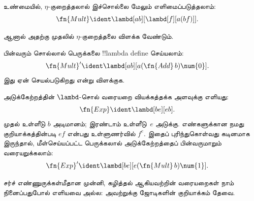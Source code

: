 \documentclass[../../../include/open-logic-section]{subfiles}
\begin{document}
\begin{editorial}
உண்மையில், $\eta$-குறைத்தலால் இச்சொல்லை மேலும் எளிமைப்படுத்தலாம்:
\[
  \fn{Mult} \ident \lambd[ab][\lambd[f][a (b f)]].
\]

ஆனால் அதற்கு முதலில் $\eta$-குறைத்தலை விளக்க வேண்டும்.
\end{editorial}

\begin{prob}
பின்வரும் சொல்லால் பெருக்கலை !!{lambda define} செய்யலாம்:
\[
  \fn{Mult}' \ident \lambd[ab][a (\fn{Add}\, b) \num{0}].
\]
இது ஏன் செயல்படுகிறது என்று விளக்குக.
\end{prob}

அடுக்கேற்றத்தின் $\lambd$-சொல் வரையறை வியக்கத்தக்க அளவுக்கு எளியது:
\[
  \fn{Exp} \ident \lambd[be][e b].
\]
முதல் உள்ளீடு $b$ அடிமானம்; இரண்டாம் உள்ளீடு~$e$ அடுக்கு. எண்களுக்கான நமது
குறியாக்கத்தின்படி $e f$ என்பது உள்ளுணர்வில் $f^e$. இதைப் புரிந்துகொள்வது
கடினமாக இருந்தால், மீள்செய்யப்பட்ட பெருக்கலால் அடுக்கேற்றத்தைப் பின்வருமாறும்
வரையறுக்கலாம்:
\[
  \fn{Exp}' \ident \lambd[be][e (\fn{Mult}\, b) \num{1}].
\]

சர்ச் எண்ணுருக்கள்மீதான முன்னி, கழித்தல் ஆகியவற்றின் வரையறைகள் நாம்
நினைப்பதுபோல் எளியவை அல்ல: அவற்றுக்கு ஜோடிகளின் குறியாக்கம் தேவை.
\end{document}
